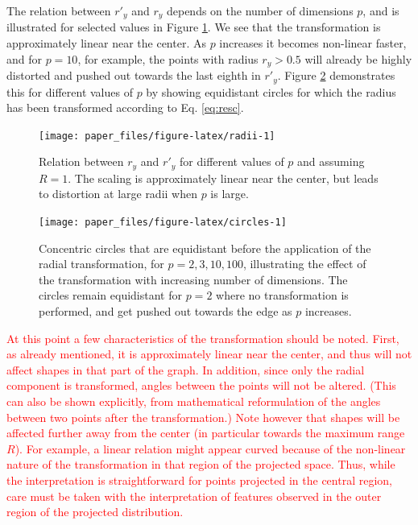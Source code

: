 \documentclass[]{interact}
\theoremstyle{plain}%
\theoremstyle{definition}
\theoremstyle{remark}
\begin{document}
The relation between \(r'_y\) and \(r_y\) depends on the number of
dimensions \(p\), and is illustrated for selected values in Figure
\ref{fig:radii}. We see that the transformation is approximately linear
near the center. As \(p\) increases it becomes non-linear faster, and
for \(p=10\), for example, the points with radius \(r_y>0.5\) will
already be highly distorted and pushed out towards the last eighth in
\(r'_y\). Figure \ref{fig:circles} demonstrates this for different
values of \(p\) by showing equidistant circles for which the radius has
been transformed according to Eq. \ref{eq:resc}.

\begin{figure}

{\centering \texttt{[image: paper\_files/figure-latex/radii-1]} 

}

\caption{Relation between $r_y$ and $r'_y$ for different values of $p$ and assuming $R=1$. The scaling is approximately linear near the center, but leads to distortion at large radii when $p$ is large.}\label{fig:radii}
\end{figure}

\begin{figure}

{\centering \texttt{[image: paper\_files/figure-latex/circles-1]} 

}

\caption{Concentric circles that are equidistant before the application of the radial transformation, for $p=2, 3, 10, 100$, illustrating the effect of the transformation with increasing number of dimensions. The circles remain equidistant for $p=2$ where no transformation is performed, and get pushed out towards the edge as $p$ increases.}\label{fig:circles}
\end{figure}

\textcolor{red}{At this point a few characteristics of the transformation should be noted. First, as already mentioned, it is approximately linear near the center, and thus will not affect shapes in that part of the graph. In addition, since only the radial component is transformed, angles between the points will not be altered. (This can also be shown explicitly, from mathematical reformulation of the angles between two points after the transformation.) Note however that shapes will be affected further away from the center (in particular towards the maximum range $R$). For example, a linear relation might appear curved because of the non-linear nature of the transformation in that region of the projected space. Thus, while the interpretation is straightforward for points projected in the central region, care must be taken with the interpretation of features observed in the outer region of the projected distribution.}
\end{document}
